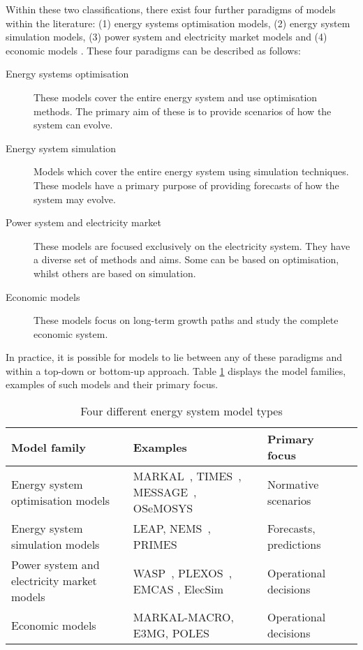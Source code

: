 Within these two classifications, there exist four further paradigms of models within the literature: (1) energy systems optimisation models, (2) energy system simulation models, (3) power system and electricity market models and (4) economic models \cite{Pfenninger2014b}. These four paradigms can be described as follows:

\begin{description}
	\item[Energy systems optimisation] These models cover the entire energy system and use optimisation methods. The primary aim of these is to provide scenarios of how the system can evolve.
	\item[Energy system simulation] Models which cover the entire energy system using simulation techniques. These models have a primary purpose of providing forecasts of how the system may evolve.
	\item[Power system and electricity market] These models are focused exclusively on the electricity system. They have a diverse set of methods and aims. Some can be based on optimisation, whilst others are based on simulation.
	\item[Economic models] These models focus on long-term growth paths and study the complete economic system.
\end{description}

In practice, it is possible for models to lie between any of these paradigms and within a top-down or bottom-up approach. Table \ref{tab:litreview:modeltypes} displays the model families, examples of such models and their primary focus.


\begin{table}[]
	\footnotesize
	\begin{tabular}{p{5cm}p{7cm}ll@{}}
		\toprule
		Model family                               & Examples                                 & Primary focus                            \\ \midrule
		Energy system optimisation models          & MARKAL~\cite{Fishbone1981a}, TIMES~\cite{Giannakidis2013}, MESSAGE~\cite{Schrattenholzer1981}, OSeMOSYS~\cite{Howells2011a}        & Normative scenarios                      \\
		Energy system simulation models            & LEAP\cite{LEAP2012a}, NEMS~\cite{Grozev2005a}, PRIMES\cite{Capros2012}                       & Forecasts, predictions                   \\
		Power system and electricity market models & WASP~\cite{WASP2001}, PLEXOS~\cite{PLEXOS2013}, EMCAS \cite{Conzelmann}, ElecSim\cite{Kell}             & Operational decisions \\
		Economic models & MARKAL-MACRO, E3MG, POLES   & Operational decisions \\
		\bottomrule
	\end{tabular}
	\caption{Four different energy system model types \cite{Pfenninger2014b}}
	\label{tab:litreview:modeltypes}
\end{table}



